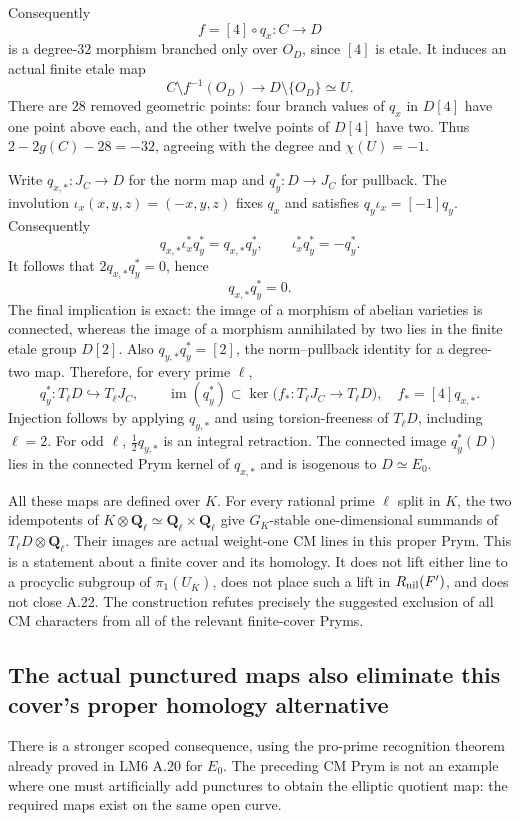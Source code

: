 Consequently
\[
 f=[4]\circ q_x:C\longrightarrow D
\]
is a degree-$32$ morphism branched only over $O_D$, since $[4]$ is etale. It induces an actual finite etale map
\[
 C\setminus f^{-1}(O_D)\longrightarrow D\setminus\{O_D\}\simeq U.
\]
There are $28$ removed geometric points: four branch values of $q_x$ in $D[4]$ have one point above each, and the other twelve points of $D[4]$ have two. Thus $2-2g(C)-28=-32$, agreeing with the degree and $\chi(U)=-1$.

Write $q_{x,*}:J_C\to D$ for the norm map and $q_y^*:D\to J_C$ for pullback. The involution $\iota_x(x,y,z)=(-x,y,z)$ fixes $q_x$ and satisfies $q_y\iota_x=[-1]q_y$. Consequently
\[
 q_{x,*}\iota_x^*q_y^*=q_{x,*}q_y^*,\qquad
 \iota_x^*q_y^*=-q_y^*.
\]
It follows that $2q_{x,*}q_y^*=0$, hence
\[
 q_{x,*}q_y^*=0.
\]
The final implication is exact: the image of a morphism of abelian varieties is connected, whereas the image of a morphism annihilated by two lies in the finite etale group $D[2]$. Also $q_{y,*}q_y^*=[2]$, the norm--pullback identity for a degree-two map. Therefore, for every prime $\ell$,
\[
 q_y^*:T_\ell D\hookrightarrow T_\ell J_C,
 \qquad \operatorname{im}(q_y^*)\subset
 \ker\bigl(f_*:T_\ell J_C\to T_\ell D\bigr),
 \quad f_*=[4]q_{x,*}.
\]
Injection follows by applying $q_{y,*}$ and using torsion-freeness of $T_\ell D$, including $\ell=2$. For odd $\ell$, $\tfrac12q_{y,*}$ is an integral retraction. The connected image $q_y^*(D)$ lies in the connected Prym kernel of $q_{x,*}$ and is isogenous to $D\simeq E_0$.

All these maps are defined over $K$. For every rational prime $\ell$ split in $K$, the two idempotents of $K\otimes\mathbf Q_\ell\simeq\mathbf Q_\ell\times\mathbf Q_\ell$ give $G_K$-stable one-dimensional summands of $T_\ell D\otimes\mathbf Q_\ell$. Their images are actual weight-one CM lines in this proper Prym. This is a statement about a finite cover and its homology. It does not lift either line to a procyclic subgroup of $\pi_1(U_{\overline K})$, does not place such a lift in $R_{\rm nil}(F')$, and does not close A.22. The construction refutes precisely the suggested exclusion of all CM characters from all of the relevant finite-cover Pryms.

\subsection*{The actual punctured maps also eliminate this cover's proper homology alternative}
There is a stronger scoped consequence, using the pro-prime recognition theorem already proved in LM6 A.20 for $E_0$. The preceding CM Prym is not an example where one must artificially add punctures to obtain the elliptic quotient map: the required maps exist on the same open curve.

